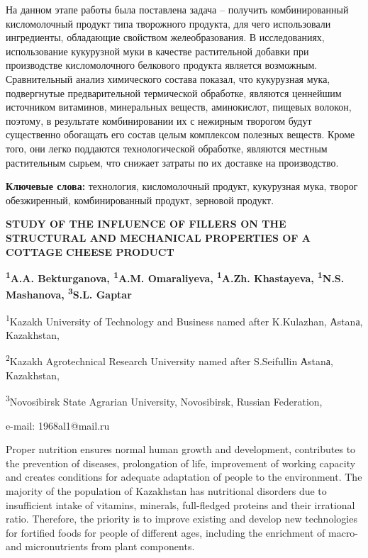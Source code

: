 На данном этапе работы была поставлена задача -- получить
комбинированный кисломолочный продукт типа творожного продукта, для чего
использовали ингредиенты, обладающие свойством желеобразования. В
исследованиях, использование кукурузной муки в качестве растительной
добавки при производстве кисломолочного белкового продукта является
возможным. Сравнительный анализ химического состава показал, что
кукурузная мука, подвергнутые предварительной термической обработке,
являются ценнейшим источником витаминов, минеральных веществ,
амино­кислот, пищевых волокон, поэтому, в результате комбинировании их с
нежир­ным творогом будут существенно обогащать его состав целым
комплексом полезных веществ. Кроме того, они легко поддаются
технологической обра­ботке, являются местным растительным сырьем, что
снижает затраты по их доставке на производство.

{\bfseries Ключевые слова:} технология, кисломолочный продукт, кукурузная
мука, творог обезжиренный, комбинированный продукт, зерновой продукт.

\begin{articleheader}
{\bfseries STUDY OF THE INFLUENCE OF FILLERS ON THE STRUCTURAL AND MECHANICAL PROPERTIES OF A COTTAGE CHEESE PRODUCT}

{\bfseries
\textsuperscript{1}A.A. Bekturganova\textsuperscript{\envelope },
\textsuperscript{1}A.M. Omaraliyeva,
\textsuperscript{1}A.Zh. Khastayeva,
\textsuperscript{1}N.S. Mashanova,
\textsuperscript{3}S.L. Gaptar
}
\end{articleheader}

\begin{affiliation}
\textsuperscript{1}Kazakh University of Technology and Business named after K.Kulazhan, Аstanа, Kazakhstan,

\textsuperscript{2}Kazakh Agrotechnical Research University named after S.Seifullin Аstanа, Kazakhstan,

\textsuperscript{3}Novosibirsk State Agrarian University, Novosibirsk, Russian Federation,

e-mail: 1968al1@mail.ru
\end{affiliation}

Proper nutrition ensures normal human growth and development,
contributes to the prevention of diseases, prolongation of life,
improvement of working capacity and creates conditions for adequate
adaptation of people to the environment. The majority of the population
of Kazakhstan has nutritional disorders due to insufficient intake of
vitamins, minerals, full-fledged proteins and their irrational ratio.
Therefore, the priority is to improve existing and develop new
technologies for fortified foods for people of different ages, including
the enrichment of macro- and micronutrients from plant components.

